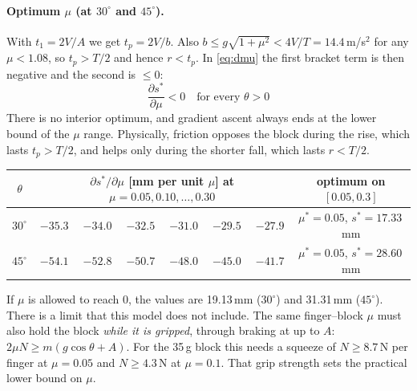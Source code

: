 \documentclass[11pt,a4paper]{article}
\begin{document}
\paragraph{Optimum $\mu$ (at $30^\circ$ and $45^\circ$).} With $t_1=2V/A$ we get $t_p=2V/b$. Also
$b\le g\sqrt{1+\mu^2}<4V/T=14.4$\,m/s$^2$ for any $\mu<1.08$, so $t_p>T/2$ and hence $r<t_p$. In \eqref{eq:dmu}
the first bracket term is then negative and the second is $\le0$:
\[
  \boxed{\ \frac{\partial s^*}{\partial\mu}<0\quad\text{for every }\theta>0\ }
\]
There is no interior optimum, and gradient ascent always ends at the lower bound of the $\mu$ range. Physically,
friction opposes the block during the rise, which lasts $t_p>T/2$, and helps only during the shorter fall, which
lasts $r<T/2$.
\begin{center}
\small
\begin{tabular}{c|cccccc|c}
\toprule
$\theta$ & \multicolumn{6}{c|}{$\partial s^*/\partial\mu$ [mm per unit $\mu$] at $\mu=0.05,0.10,\dots,0.30$} & optimum on $[0.05,0.3]$\\
\midrule
$30^\circ$ & $-35.3$ & $-34.0$ & $-32.5$ & $-31.0$ & $-29.5$ & $-27.9$ & $\mu^*=0.05$, $s^*=17.33$\,mm\\
$45^\circ$ & $-54.1$ & $-52.8$ & $-50.7$ & $-48.0$ & $-45.0$ & $-41.7$ & $\mu^*=0.05$, $s^*=28.60$\,mm\\
\bottomrule
\end{tabular}
\end{center}
If $\mu$ is allowed to reach 0, the values are 19.13\,mm ($30^\circ$) and 31.31\,mm ($45^\circ$). There is a limit
that this model does not include. The same finger--block $\mu$ must also hold the block \emph{while it is gripped},
through braking at up to $A$: $2\mu N\ge m(g\cos\theta+A)$. For the 35\,g block this needs a squeeze of $N\ge8.7$\,N
per finger at $\mu=0.05$ and $N\ge4.3$\,N at $\mu=0.1$. That grip strength sets the practical lower bound on $\mu$.
\end{document}
